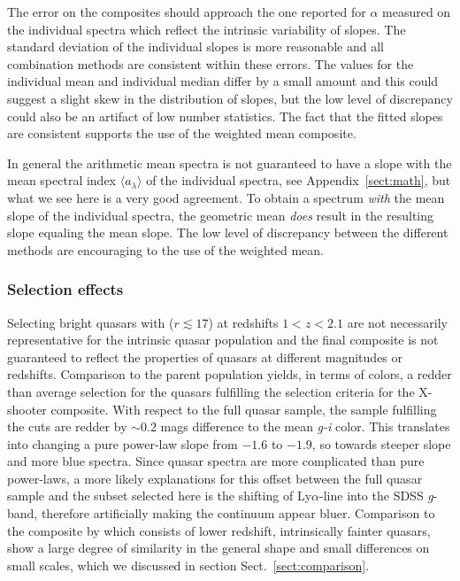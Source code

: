 \documentclass{aa}    %
\newcommand{\sectionname}{Sect.}
\newcommand{\Sect}[1]{\sectionname~\ref{sect:#1}}
\newcommand{\sect}[1]{\Sect{#1}}
\newcommand{\App}[1]{Appendix~\ref{sect:#1}}
\newcommand{\app}[1]{\App{#1}}
\newcommand{\sectlabel}[1]{\label{sect:#1}}
\newcommand{\lya}{Ly$\alpha$}
\begin{document}
{{The error on the composites should approach the one reported for $\alpha$ measured on the individual spectra which reflect the intrinsic variability of slopes. The standard deviation of the individual slopes is more reasonable and all combination methods are consistent within these errors. The values for the individual mean and individual median differ by a small amount and this could suggest a slight skew in the distribution of slopes, but the low level of discrepancy could also be an artifact of low number statistics. The fact that the fitted slopes are consistent supports the use of the weighted mean composite.

In general the arithmetic mean spectra is not guaranteed to have a slope with the mean spectral index $\langle a_\lambda\rangle$ of the individual spectra, see \app{math}, but what we see here is a very good agreement. To obtain a spectrum \textit{with} the mean slope of the individual spectra, the geometric mean \textit{does} result in the resulting slope equaling the mean slope. The low level of discrepancy between the different methods are encouraging to the use of the weighted mean.
}
\subsubsection{Selection effects}  \sectlabel{Selection effects}
Selecting bright quasars with ($r \lesssim 17$) at redshifts $1 < z < 2.1$ are not necessarily representative for the intrinsic quasar population \citep{Paris2014} and the final composite is not guaranteed to reflect the properties of quasars at different magnitudes or redshifts. Comparison to the parent population yields, in terms of colors, a redder than average selection for the quasars fulfilling the selection criteria for the X-shooter composite. With respect to the full quasar sample, the sample fulfilling the cuts are redder by $\sim 0.2$ mags difference to the mean \textit{g-i} color. This translates into changing a pure power-law slope from $-1.6$ to $-1.9$, so towards steeper slope and more blue spectra. Since quasar spectra are more complicated than pure power-laws, a more likely explanations for this offset between the full quasar sample and the subset selected here is the shifting of \lya-line into the SDSS \textit{g}-band, therefore artificially making the continuum appear bluer.
Comparison to the composite by \citet{VandenBerk2001} which consists of lower redshift, intrinsically fainter quasars, show a large degree of similarity in the general shape and small differences on small scales, which we discussed in section \sect{comparison}. 


}
\end{document}
